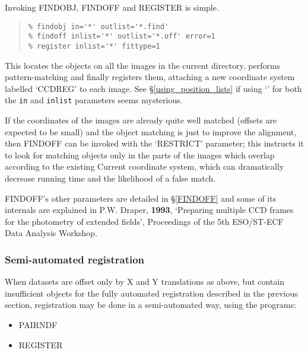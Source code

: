 \documentclass[twoside,11pt]{article}
\newcommand{\hyperref}[4]{#2\ref{#4}#3}
\newcommand{\htmlref}[2]{#1}
\newcommand{\xlabel}[1]{}
\renewcommand{\_}{\texttt{\symbol{95}}}
\newenvironment{myquote}{\begin{quote}\begin{small}}{\end{small}\end{quote}}
\newcommand{\text}[1]{{\small \tt #1}}
\newcommand{\routine}[1]{{\sc #1}}
\newcommand{\xroutine}[1]{\htmlref{{\sc #1}}{#1}}
\begin{document}
Invoking \xroutine{FINDOBJ}, \xroutine{FINDOFF} and
\xroutine{REGISTER} is simple.
\begin{myquote}
\begin{verbatim}
% findobj in='*' outlist='*.find'
% findoff inlist='*' outlist='*.off' error=1
% register inlist='*' fittype=1
\end{verbatim}
\end{myquote}
This locates the objects on all the images in the current directory,
performs pattern-matching and finally registers them, attaching
a new coordinate system labelled `CCD\_REG' to each image.
See \hyperref{``Using position lists''}{\S}{}{using_position_lists}
if using `\text{*}' for both the \text{in} and \text{inlist}
parameters seems mysterious.

If the coordinates of the images are already quite well matched
(offsets are expected to be small) 
and the object matching is just to improve the alignment,
then \routine{FINDOFF} can be invoked with the `RESTRICT' parameter;
this instructs it to look for matching objects only in the
parts of the images which overlap according to the existing
Current coordinate system, which can dramatically decrease running time 
and the likelihood of a false match.

\routine{FINDOFF}'s other parameters are detailed in
\hyperref{a later section}{\S}{}{FINDOFF} and some of its internals are
explained in P.W. Draper, {\bf 1993}, `Preparing multiple CCD frames for the
photometry of extended fields', Proceedings of the 5th ESO/ST-ECF Data
Analysis Workshop.



\subsubsection{\xlabel{semiautomated}Semi-automated registration}

When datasets are offset only by X and Y translations as above,
but contain insufficient objects for the fully automated registration
described in the previous section, 
registration may be done in a semi-automated way,
using the programs:
\begin{itemize}
\item \xroutine{PAIRNDF}
\item \xroutine{REGISTER}
\end{itemize}
\end{document}
